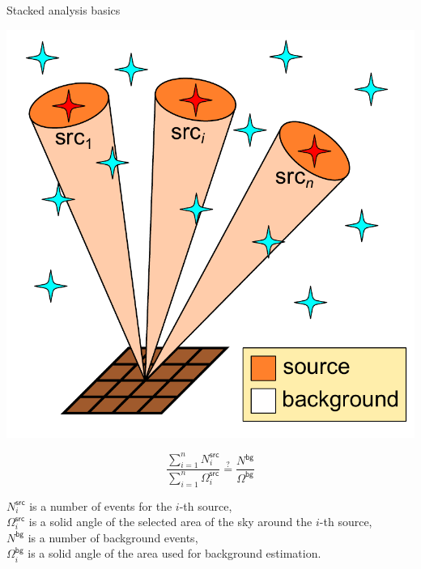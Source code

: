 \begin{frame}{Stacked analysis basics}
\begin{minipage}[c]{0.57\textwidth}
  \includegraphics[width=1\textwidth]{pics/stacked.pdf}
\end{minipage}
\hfill
\begin{minipage}[c]{0.39\textwidth}
{
\Large
\[
\frac{\sum_{i=1}^n N_i^\mathsf{src}}{\sum_{i=1}^n \Omega_i^\mathsf{src}} \stackrel{?}{=}
\frac{N^\mathsf{bg}}{\Omega^\mathsf{bg}}
\]
}

$N_i^\mathsf{src}$ is a number of events for the $i$-th source,\\
$\Omega_i^\mathsf{src}$ is a solid angle of the selected area of the sky around the $i$-th source,\\
$N^\mathsf{bg}$ is a number of background events,\\
$\Omega_i^\mathsf{bg}$ is a solid angle of the area used for background estimation.
\end{minipage}
\end{frame}

